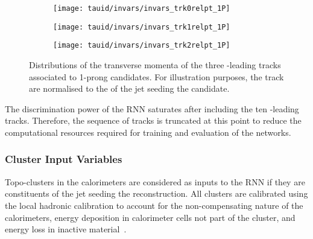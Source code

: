 \begin{figure}[htbp]
  \centering

  \begin{subfigure}{0.33\textwidth}
    \texttt{[image: tauid/invars/invars\_trk0relpt\_1P]}
    \subcaption{}%
    \label{fig:tauid_low_level_variables_track0}
  \end{subfigure}%
  \begin{subfigure}{0.33\textwidth}
    \texttt{[image: tauid/invars/invars\_trk1relpt\_1P]}
    \subcaption{}%
    \label{fig:tauid_low_level_variables_track1}
  \end{subfigure}%
  \begin{subfigure}{0.33\textwidth}
    \texttt{[image: tauid/invars/invars\_trk2relpt\_1P]}
    \subcaption{}%
    \label{fig:tauid_low_level_variables_track2}
  \end{subfigure}

  \caption[Distributions of the transverse momenta of the three \pT-leading
  tracks associated to 1-prong \tauhadvis candidates.]{Distributions of the
    transverse momenta of the three \pT-leading tracks associated to 1-prong
    \tauhadvis candidates. For illustration purposes, the track \pT are
    normalised to the \pT of the jet seeding the \tauhadvis candidate.}%
  \label{fig:tauid_low_level_variables_track}
\end{figure}

The discrimination power of the RNN \tauid saturates after including the ten
\pT-leading tracks. Therefore, the sequence of tracks is truncated at this point
to reduce the computational resources required for training and evaluation of
the networks.


\subsubsection{Cluster Input Variables}

Topo-clusters in the calorimeters are considered as inputs to the RNN \tauid if
they are constituents of the jet seeding the \tauhadvis reconstruction. All
clusters are calibrated using the local hadronic calibration to account for the
non-compensating nature of the calorimeters, energy deposition in calorimeter
cells not part of the cluster, and energy loss in inactive
material~\cite{PERF-2014-07}.

